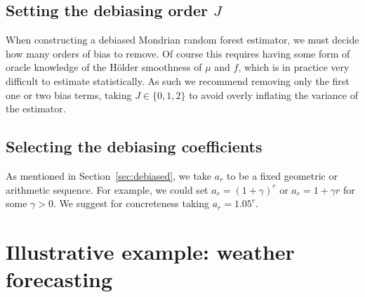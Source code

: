 \subsection{Setting the debiasing order \texorpdfstring{$J$}{J}}%

When constructing a debiased Mondrian random forest estimator,
we must decide how many orders of bias to remove.
Of course this requires having some form of oracle knowledge of the
H{\"o}lder smoothness of $\mu$ and $f$,
which is in practice very difficult to estimate statistically.
As such we recommend removing only the first one or two
bias terms, taking $J \in \{0,1,2\}$
to avoid overly inflating the variance of the estimator.

\subsection{Selecting the debiasing coefficients}%

As mentioned in Section~\ref{sec:debiased},
we take $a_r$ to be a fixed geometric or arithmetic sequence.
For example, we could set
$a_r = (1+\gamma)^r$
or $a_r = 1 + \gamma r$ for some $\gamma > 0$.
We suggest for concreteness taking $a_r = 1.05^r$.

\section{Illustrative example: weather forecasting}%

